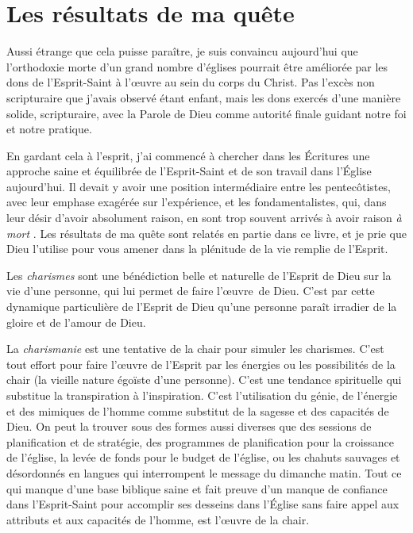 \section{Les r\'esultats de ma qu\^ete}

Aussi étrange que cela puisse paraître, je suis convaincu aujour\-d'hui que
 l'orthodoxie morte d'un grand nombre d'églises pourrait être améliorée par les
 dons de l'Esprit-Saint à l'œuvre au sein du corps du Christ. Pas l'excès non scripturaire que
 j'avais observé étant enfant, mais les dons exercés d'une manière solide,
 scripturaire, avec la Parole de Dieu comme autorité finale guidant notre foi et
 notre pratique.

En gardant cela à l'esprit, j'ai commencé à chercher dans les Écritures une
 approche saine et équilibrée de l'Esprit-Saint et de son travail dans l'Église
 aujourd'hui. Il devait y avoir une position inter\-mé\-di\-aire entre les
 pentecôtistes, avec leur emphase exagérée sur l'ex\-pé\-rience, et les
 fondamentalistes, qui, dans leur désir d'avoir absolument raison,
 en sont trop souvent arrivés à avoir raison \emph{à mort}
 .
 Les résultats de ma quête sont relatés en partie dans ce livre, et je prie que
 Dieu l'utilise pour vous amener dans la plénitude de la vie remplie de
 l'Esprit.

Les \emph{charismes} sont une bénédiction belle et naturelle de l'Esprit de Dieu
 sur la vie d'une personne, qui lui permet de faire l'œuvre~de Dieu. C'est par
 cette dynamique particulière de l'Esprit de Dieu qu'une personne paraît irradier de
 la gloire et de l'amour de Dieu.

La \emph{charismanie} est une tentative de la chair pour simuler les charismes.
 C'est tout effort pour faire l'œuvre de l'Esprit par les énergies ou les
 possibilités de la chair (la vieille nature égoïste d'une personne). C'est
 une tendance spirituelle qui substitue la transpiration à l'inspiration. C'est
 l'utilisation du génie, de l'énergie et des mimiques de l'homme comme substitut
 de la sagesse et des capacités de Dieu. On peut la trouver sous des formes
 aussi diverses que des sessions de planification et de stratégie, des
 programmes de planification pour la croissance de l'église, la levée de fonds
 pour le budget de l'église, ou les chahuts sauvages et désordonnés en langues
 qui interrompent le message du dimanche matin. Tout ce qui manque d'une base
 biblique saine et fait preuve d'un manque de confiance dans l'Esprit-Saint pour
 accomplir ses desseins dans l'Église sans faire appel aux attributs
 et aux capacités de l'homme, est l'œuvre de la chair.

